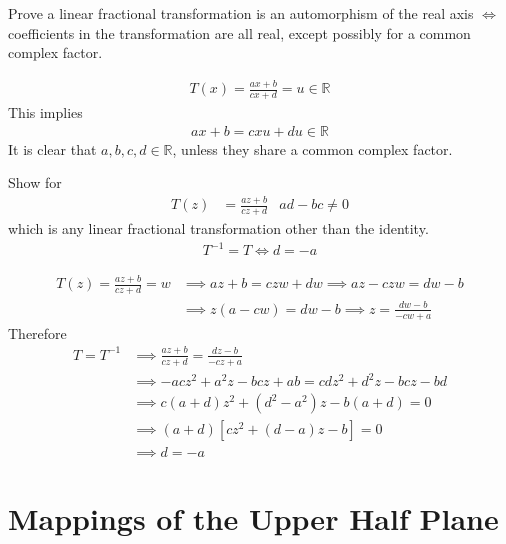 \documentclass[12pt, english]{book}
\makeatletter
\renewenvironment{proof}[1][\proofname]{\par
	\pushQED{\qed}%
	\normalfont \topsep6\p@\@plus6\p@\relax
	\list{}{%
		\settowidth{\leftmargin}{\itshape\proofname:\hskip\labelsep}%
		\setlength{\labelwidth}{0pt}%
		\setlength{\itemindent}{-\leftmargin}%
	}%
	\item[\hskip\labelsep\itshape#1\@addpunct{:}]\ignorespaces
	}{ \popQED\endlist\@endpefalse}
\makeatother
\begin{document}
	\begin{example}
		Prove a linear fractional transformation is an automorphism of the real axis \(\iff\) coefficients in the transformation are all real, except possibly for a common complex factor. 
		\begin{proof}
			{\color{Grey}
			\begin{align*}
				T(x) = \frac{ax + b}{cx + d} = u \in \mathbb{R}
			\end{align*}
			This implies
			\begin{align*}
				ax + b = cxu + du \in \mathbb{R}
			\end{align*}
			It is clear that \(a, b, c, d \in \mathbb{R}\), unless they share a common complex factor.
			}
		\end{proof}
	\end{example}

	\begin{example}
		Show for 
		\begin{align*}
			T(z) &= \frac{az + b}{cz + d} & ad - bc \neq 0
		\end{align*}
		which is any linear fractional transformation other than the identity. 
		\begin{align*}
			T^{-1} = T \iff d = -a
		\end{align*}
		\begin{proof}
			{\color{Grey}
			\begin{align*}
				T(z) = \frac{az + b}{cz + d} = w 
				&\implies az + b = czw + dw \implies az - czw = dw - b \\
				&\implies z(a - cw) = dw - b\implies z = \frac{dw - b}{-cw + a}
			\end{align*}
			Therefore
			\begin{align*}
				T = T^{-1}
				&\implies \frac{az + b}{cz + d} = \frac{dz - b}{-cz + a} \\
				&\implies -acz^2 + a^2 z - bcz + ab = cdz^2 + d^2 z - bcz - bd \\
				&\implies c(a+d)z^2 + (d^2 - a^2)z - b(a+d) = 0 \\
				&\implies(a + d)[cz^2 + (d-a)z - b] = 0 \\
				&\implies d = -a
			\end{align*}
			}
		\end{proof}
	\end{example}
	
	\section{Mappings of the Upper Half Plane} \label{Mappings of the Upper Half Plane Section - Complex}
	
\end{document}
